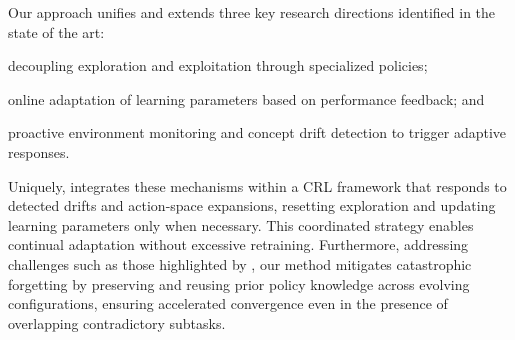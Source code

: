 Our approach unifies and extends three key research directions identified in the state of the art: 
\begin{enumerate*}[label=(\arabic*)] 
\item decoupling exploration and exploitation through specialized policies; 
\item online adaptation of learning parameters based on performance feedback; and 
\item proactive environment monitoring and concept drift detection to trigger adaptive responses. 
\end{enumerate*}
Uniquely, \adaptiverl integrates these mechanisms within a \ac{CRL} framework that responds to detected drifts and action-space expansions, resetting exploration and updating learning parameters only when necessary. This coordinated strategy enables continual adaptation without excessive retraining. Furthermore, addressing challenges such as those highlighted by \citet{Bagus2022}, our method mitigates catastrophic forgetting by preserving and reusing prior policy knowledge across evolving configurations, ensuring accelerated convergence even in the presence of overlapping contradictory subtasks.  

\endinput
